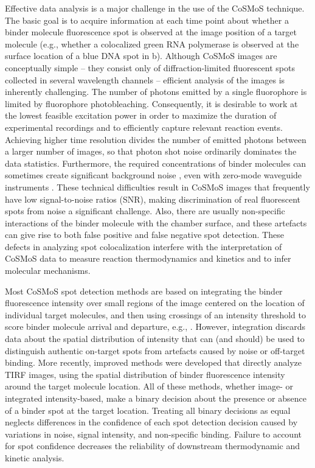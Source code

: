 Effective data analysis is a major challenge in the use of the CoSMoS technique. The basic goal is to acquire information at each time point about whether a binder molecule fluorescence spot is observed at the image position of a target molecule (e.g., whether a colocalized green RNA polymerase is observed at the surface location of a blue DNA spot in b). Although CoSMoS images are conceptually simple -- they consist only of diffraction-limited fluorescent spots collected in several wavelength channels -- efficient analysis of the images is inherently challenging. The number of photons emitted by a single fluorophore is limited by fluorophore photobleaching. Consequently, it is desirable to work at the lowest feasible excitation power in order to maximize the duration of experimental recordings and to efficiently capture relevant reaction events. Achieving higher time resolution divides the number of emitted photons between a larger number of images, so that photon shot noise ordinarily dominates the data statistics. Furthermore, the required concentrations of binder molecules can sometimes create significant background noise \citep{Peng2018-ge, Van_Oijen2011-ig}, even with zero-mode waveguide instruments \citep{Chen2014-jd}. These technical difficulties result in CoSMoS images that frequently have low signal-to-noise ratios (SNR), making discrimination of real fluorescent spots from noise a significant challenge. Also, there are usually non-specific interactions of the binder molecule with the chamber surface, and these artefacts can give rise to both false positive and false negative spot detection. These defects in analyzing spot colocalization interfere with the interpretation of CoSMoS data to measure reaction thermodynamics and kinetics and to infer molecular mechanisms.

Most CoSMoS spot detection methods are based on integrating the binder fluorescence intensity over small regions of the image centered on the location of individual target molecules, and then using crossings of an intensity threshold to score binder molecule arrival and departure, e.g., \citep{Friedman2012-if,Shcherbakova2013-bi}. However, integration discards data about the spatial distribution of intensity that can (and should) be used to distinguish authentic on-target spots from artefacts caused by noise or off-target binding.  More recently, improved methods \citep{Friedman2015-nx,Smith2019-yb} were developed that directly analyze TIRF images, using the spatial distribution of binder fluorescence intensity around the target molecule location. All of these methods, whether image- or integrated intensity-based, make a binary decision about the presence or absence of a binder spot at the target location.  Treating all binary decisions as equal neglects differences in the confidence of each spot detection decision caused by variations in noise, signal intensity, and non-specific binding.  Failure to account for spot confidence decreases the reliability of downstream thermodynamic and kinetic analysis.

